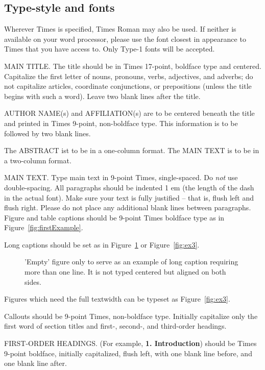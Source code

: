 \subsection{Type-style and fonts}

Wherever Times is specified, Times Roman may also be used. If
neither is available on your word processor, please use the font
closest in appearance to Times that you have access to. Only
Type-1 fonts will be accepted.

MAIN TITLE. The title should be in Times 17-point, boldface type and
centered. Capitalize the first letter of nouns, pronouns, verbs, adjectives,
and adverbs; do not capitalize articles, coordinate conjunctions, or
prepositions (unless the title begins with such a word). Leave two blank
lines after the title.

AUTHOR NAME(s) and AFFILIATION(s) are to be centered beneath the title and
printed in Times 9-point, non-boldface type. This information is to be
followed by two blank lines.

The ABSTRACT ist to be in a one-column format. The MAIN TEXT is to be in a
two-column format.

MAIN TEXT. Type main text in 9-point Times, single-spaced. Do \emph{not} use
double-spacing. All paragraphs should be indented 1 em (the length of the
dash in the actual font). Make sure your text is fully justified -- that is,
flush left and flush right. Please do not place any additional blank lines
between paragraphs. Figure and table captions should be 9-point Times
boldface type as in Figure~\ref{fig:firstExample}.

\noindent Long captions should be set as in Figure~\ref{fig:ex1} or
Figure~\ref{fig:ex3}.

\begin{figure}[htb]
\caption{\label{fig:ex1}
     'Empty' figure only to serve as an example of long caption requiring 
     more than one line. It is not typed centered but aligned on both sides.}
\end{figure}

\noindent
Figures which need the full textwidth can be typeset as Figure~\ref{fig:ex3}.

\noindent Callouts should be 9-point Times, non-boldface type. Initially
capitalize only the first word of section titles and first-, second-, and
third-order headings.

FIRST-ORDER HEADINGS. (For example, \textbf{1. Introduction}) should be Times
9-point boldface, initially capitalized, flush left, with one blank line
before, and one blank line after.

